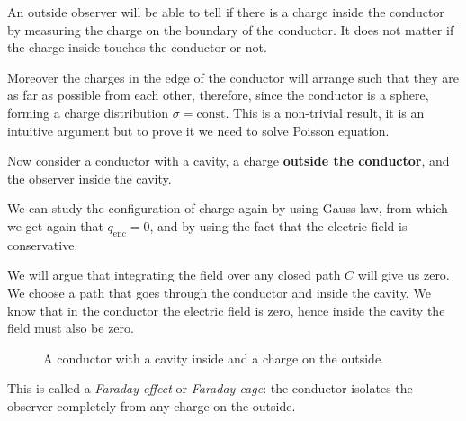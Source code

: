 \documentclass[12pt]{extarticle}
\begin{document}
An outside observer will be able to tell if there is a charge inside the conductor by measuring the charge on the boundary of the conductor.
It does not matter if the charge inside touches the conductor or not.

Moreover the charges in the edge of the conductor will arrange such that they are as far as possible from each other, therefore, since the conductor is a sphere, forming a charge distribution $\sigma = \text{const}$.
This is a non-trivial result, it is an intuitive argument but to prove it we need to solve Poisson equation.

Now consider a conductor with a cavity, a charge \textbf{outside the conductor}, and the observer inside the cavity.

We can study the configuration of charge again by using Gauss law, from which we get again that $q_\text{enc} = 0$, and by using the fact that the electric field is conservative.

We will argue that integrating the field over any closed path $C$ will give us zero.
We choose a path that goes through the conductor and inside the cavity.
We know that in the conductor the electric field is zero, hence inside the cavity the field must also be zero.

\begin{figure}[H]
    \centering
    
    \caption{A conductor with a cavity inside and a charge on the outside.}
\end{figure}

This is called a \emph{Faraday effect} or \emph{Faraday cage}: the conductor isolates the observer completely from any charge on the outside.
\end{document}
